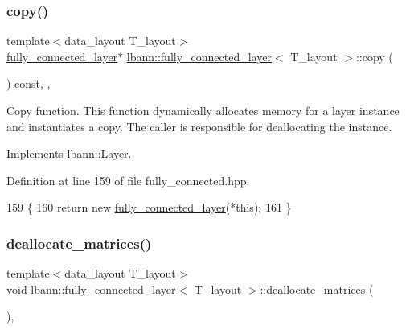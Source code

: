 \subsubsection{\texorpdfstring{copy()}{copy()}}
{\footnotesize\ttfamily template$<$data\+\_\+layout T\+\_\+layout$>$ \\
\hyperlink{classlbann_1_1fully__connected__layer}{fully\+\_\+connected\+\_\+layer}$\ast$ \hyperlink{classlbann_1_1fully__connected__layer}{lbann\+::fully\+\_\+connected\+\_\+layer}$<$ T\+\_\+layout $>$\+::copy (\begin{DoxyParamCaption}{ }\end{DoxyParamCaption}) const\hspace{0.3cm}{\ttfamily [inline]}, {\ttfamily [override]}, {\ttfamily [virtual]}}

Copy function. This function dynamically allocates memory for a layer instance and instantiates a copy. The caller is responsible for deallocating the instance. 

Implements \hyperlink{classlbann_1_1Layer_af420f22bbac801c85483ade84588a23f}{lbann\+::\+Layer}.



Definition at line 159 of file fully\+\_\+connected.\+hpp.


\begin{DoxyCode}
159                                                \{
160     \textcolor{keywordflow}{return} \textcolor{keyword}{new} \hyperlink{classlbann_1_1fully__connected__layer_ae5d9a0f2851f3c55abe47aa65afbe66c}{fully\_connected\_layer}(*\textcolor{keyword}{this});
161   \}
\end{DoxyCode}
\mbox{\label{classlbann_1_1fully__connected__layer_a91f359a41cfbab6f21bd67bccb8409b1}} 
\subsubsection{\texorpdfstring{deallocate\+\_\+matrices()}{deallocate\_matrices()}}
{\footnotesize\ttfamily template$<$data\+\_\+layout T\+\_\+layout$>$ \\
void \hyperlink{classlbann_1_1fully__connected__layer}{lbann\+::fully\+\_\+connected\+\_\+layer}$<$ T\+\_\+layout $>$\+::deallocate\+\_\+matrices (\begin{DoxyParamCaption}{ }\end{DoxyParamCaption})\hspace{0.3cm}{\ttfamily [inline]}, {\ttfamily [private]}}

